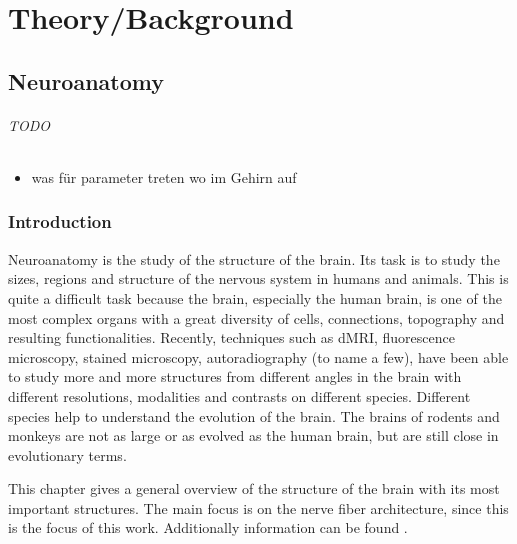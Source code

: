 \cleardoublepage
\part{Theory/Background}
\parttoc
% 
% 
% 
\setcounter{chapter}{1}
\chapter{Neuroanatomy}
\label{chap:neuro}
%
%
%
\paragraph{TODO}
\begin{itemize}
    \item was für parameter treten wo im Gehirn auf
\end{itemize}
%
%
\section{Introduction}
%
Neuroanatomy is the study of the structure of the brain.
Its task is to study the sizes, regions and structure of the nervous system in humans and animals.
This is quite a difficult task because the brain, especially the human brain, is one of the most complex organs with a great diversity of cells, connections, topography and resulting functionalities.
Recently, techniques such as \ac{dMRI}, fluorescence microscopy, stained microscopy, autoradiography (to name a few), have been able to study more and more structures from different angles in the brain with different resolutions, modalities and contrasts on different species.
Different species help to understand the evolution of the brain. The brains of rodents and monkeys are not as large or as evolved as the human brain, but are still close in evolutionary terms.
\par
%
This chapter gives a general overview of the structure of the brain with its most important structures.
The main focus is on the nerve fiber architecture, since this is the focus of this work.
Additionally information can be found \eg{} \dummy{}.
%
%
%
